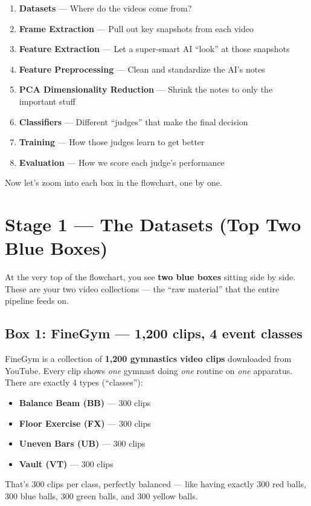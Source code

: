 \documentclass[12pt, a4paper]{article}
\begin{document}
\begin{enumerate}[label=\textbf{Stage \arabic*:}, leftmargin=2.5cm, itemsep=0.3cm]
    \item \textbf{Datasets} — Where do the videos come from?
    \item \textbf{Frame Extraction} — Pull out key snapshots from each video
    \item \textbf{Feature Extraction} — Let a super-smart AI ``look'' at those snapshots
    \item \textbf{Feature Preprocessing} — Clean and standardize the AI's notes
    \item \textbf{PCA Dimensionality Reduction} — Shrink the notes to only the important stuff
    \item \textbf{Classifiers} — Different ``judges'' that make the final decision
    \item \textbf{Training} — How those judges learn to get better
    \item \textbf{Evaluation} — How we score each judge's performance
\end{enumerate}

Now let's zoom into each box in the flowchart, one by one.

\newpage
\section{Stage 1 — The Datasets (Top Two Blue Boxes)}

At the very top of the flowchart, you see \textbf{two blue boxes} sitting side by side. These are your two video collections — the ``raw material'' that the entire pipeline feeds on.

\subsection{Box 1: FineGym — 1,200 clips, 4 event classes}

\begin{keybox}
FineGym is a collection of \textbf{1,200 gymnastics video clips} downloaded from YouTube. Every clip shows \textit{one} gymnast doing \textit{one} routine on \textit{one} apparatus. There are exactly 4 types (``classes''):
\begin{itemize}[leftmargin=1cm]
    \item \textbf{Balance Beam (BB)} — 300 clips
    \item \textbf{Floor Exercise (FX)} — 300 clips
    \item \textbf{Uneven Bars (UB)} — 300 clips
    \item \textbf{Vault (VT)} — 300 clips
\end{itemize}
That's 300 clips per class, perfectly balanced — like having exactly 300 red balls, 300 blue balls, 300 green balls, and 300 yellow balls.
\end{keybox}
\end{document}
